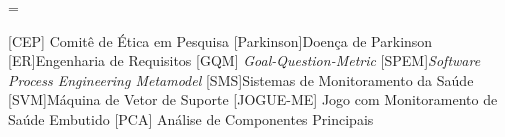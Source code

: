 \documentclass[a4paper,titlepage]{copin}
\begin{document}
\pagestyle{fancy}
\addtolength{\headwidth}{\marginparsep}\addtolength{\headwidth}{\marginparwidth}\headwidth = \textwidth
\renewcommand{\chaptermark}[1]{\markboth{#1}{}}
\renewcommand{\sectionmark}[1]{\markright{\thesection\ #1}}\lhead[\fancyplain{}{\bfseries\thepage}]%
	     {\fancyplain{}{\emph{\rightmark}}}\rhead[\fancyplain{}{\bfseries\leftmark}]%
             {\fancyplain{}{\bfseries\thepage}}\cfoot{}


\Sumario
\ListadeSimbolos
\begin{acronym}
	 [CEP] {Comitê de Ética em Pesquisa}
	[Parkinson]{Doença de Parkinson}
	[ER]{Engenharia de Requisitos}
	 [GQM] {\textit{Goal-Question-Metric}}
	 [SPEM]{\textit{Software Process Engineering Metamodel}}
	 [SMS]{Sistemas de Monitoramento da Saúde}
	 [SVM]{Máquina de Vetor de Suporte}
	 [JOGUE-ME] {Jogo com Monitoramento de Saúde Embutido}
	 [PCA] {Análise de Componentes Principais}
	
	
\end{acronym}
\end{document}
